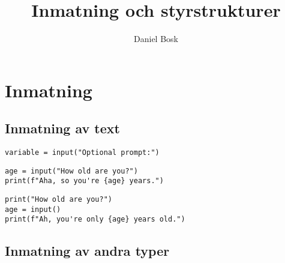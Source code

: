 \title{%
  Inmatning och styrstrukturer
}
\author{Daniel Bosk}


\mode*

\begin{abstract}
  
\end{abstract}


\section{Inmatning}

\subsection{Inmatning av text}

\begin{frame}
  \begin{center}
    \lstinline[basicstyle=\Large]{variable = input("Optional prompt:")}
  \end{center}
\end{frame}

\begin{frame}[fragile]
  \begin{example}
    \begin{lstlisting}
age = input("How old are you?")
print(f"Aha, so you're {age} years.")
    \end{lstlisting}
  \end{example}

  \pause

  \begin{example}
    \begin{lstlisting}
print("How old are you?")
age = input()
print(f"Ah, you're only {age} years old.")
    \end{lstlisting}
  \end{example}
\end{frame}

\subsection{Inmatning av andra typer}

